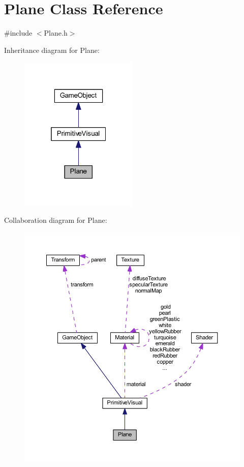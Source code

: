 \hypertarget{class_plane}{}\section{Plane Class Reference}
\label{class_plane}


{\ttfamily \#include $<$Plane.\+h$>$}



Inheritance diagram for Plane\+:
\nopagebreak
\begin{figure}[H]
\begin{center}
\leavevmode
\includegraphics[width=160pt]{class_plane__inherit__graph}
\end{center}
\end{figure}


Collaboration diagram for Plane\+:
\nopagebreak
\begin{figure}[H]
\begin{center}
\leavevmode
\includegraphics[width=350pt]{class_plane__coll__graph}
\end{center}
\end{figure}
